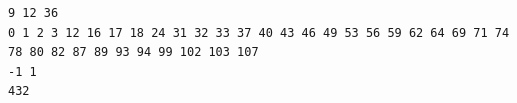 \begin{verbatim}
9 12 36
0 1 2 3 12 16 17 18 24 31 32 33 37 40 43 46 49 53 56 59 62 64 69 71 74 78 80 82 87 89 93 94 99 102 103 107 
-1 1
432
\end{verbatim}


